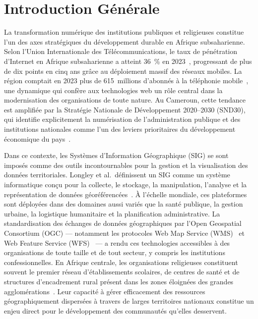 \documentclass[12pt, a4paper]{report}
\begin{document}
\setcounter{page}{1}

\chapter*{Introduction Générale}

La transformation numérique des institutions publiques et religieuses constitue
l'un des axes stratégiques du développement durable en Afrique subsaharienne.
Selon l'Union Internationale des Télécommunications, le taux de pénétration
d'Internet en Afrique subsaharienne a atteint 36~\% en 2023~\cite{itu2023},
progressant de plus de dix points en cinq ans grâce au déploiement massif des
réseaux mobiles. La région comptait en 2023 plus de 615~millions d'abonnés à la
téléphonie mobile~\cite{gsma2023}, une dynamique qui confère aux technologies web
un rôle central dans la modernisation des organisations de toute nature. Au
Cameroun, cette tendance est amplifiée par la Stratégie Nationale de
Développement 2020--2030 (SND30), qui identifie explicitement la numérisation de
l'administration publique et des institutions nationales comme l'un des leviers
prioritaires du développement économique du pays~\cite{snd2020}.

Dans ce contexte, les Systèmes d'Information Géographique (SIG) se sont imposés
comme des outils incontournables pour la gestion et la visualisation des données
territoriales. Longley et al.~définissent un SIG comme un système informatique
conçu pour la collecte, le stockage, la manipulation, l'analyse et la
représentation de données géoréférencées~\cite{longley2015}. À l'échelle
mondiale, ces plateformes sont déployées dans des domaines aussi variés que la
santé publique, la gestion urbaine, la logistique humanitaire et la planification
administrative. La standardisation des échanges de données géographiques par
l'Open Geospatial Consortium (OGC) --- notamment les protocoles Web Map Service
(WMS)~\cite{ogcwms2006} et Web Feature Service (WFS)~\cite{ogcwfs2010} --- a
rendu ces technologies accessibles à des organisations de toute taille et de tout
secteur, y compris les institutions confessionnelles. En Afrique centrale, les
organisations religieuses constituent souvent le premier réseau d'établissements
scolaires, de centres de santé et de structures d'encadrement rural présent dans
les zones éloignées des grandes agglomérations~\cite{gifford2015}. Leur capacité
à gérer efficacement des ressources géographiquement dispersées à travers de
larges territoires nationaux constitue un enjeu direct pour le développement
des communautés qu'elles desservent.
\end{document}
